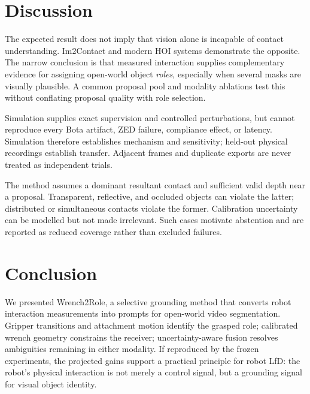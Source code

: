 \documentclass[letterpaper,10pt,journal,twoside]{IEEEtran}
\newcommand{\method}{Wrench2Role}
\begin{document}
\section{Discussion}

The expected result does not imply that vision alone is incapable of contact
understanding. Im2Contact and modern HOI systems demonstrate the opposite. The
narrow conclusion is that measured interaction supplies complementary evidence
for assigning open-world object \emph{roles}, especially when several masks are
visually plausible. A common proposal pool and modality ablations test this
without conflating proposal quality with role selection.

Simulation supplies exact supervision and controlled perturbations, but cannot
reproduce every Bota artifact, ZED failure, compliance effect, or latency.
Simulation therefore establishes mechanism and sensitivity; held-out physical
recordings establish transfer. Adjacent frames and duplicate exports are never
treated as independent trials.

The method assumes a dominant resultant contact and sufficient valid depth near
a proposal. Transparent, reflective, and occluded objects can violate the
latter; distributed or simultaneous contacts violate the former. Calibration
uncertainty can be modelled but not made irrelevant. Such cases motivate
abstention and are reported as reduced coverage rather than excluded failures.

\section{Conclusion}

We presented \method, a selective grounding method that converts robot
interaction measurements into prompts for open-world video segmentation.
Gripper transitions and attachment motion identify the grasped role; calibrated
wrench geometry constrains the receiver; uncertainty-aware fusion resolves
ambiguities remaining in either modality. If reproduced by the frozen
experiments, the projected gains support a practical principle for robot LfD:
the robot's physical interaction is not merely a control signal, but a grounding
signal for visual object identity.
\end{document}
